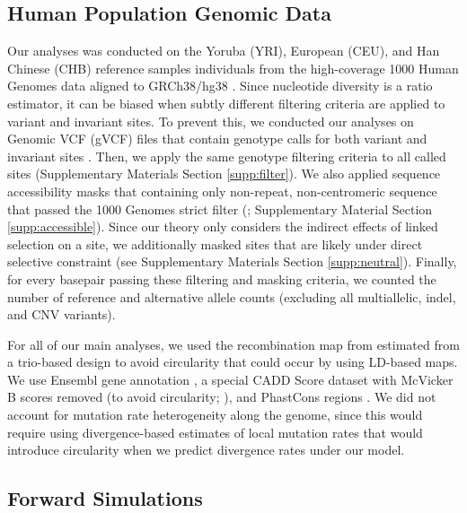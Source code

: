 \documentclass[11pt]{article}
\begin{document}
\subsection*{Human Population Genomic Data}
\label{sec:methods-data}

Our analyses was conducted on the Yoruba (YRI), European (CEU), and Han Chinese
(CHB) reference samples individuals from the high-coverage 1000 Human Genomes
data aligned to GRCh38/hg38 \parencite{Byrska-Bishop2022-tn}. Since nucleotide
diversity is a ratio estimator, it can be biased when subtly different
filtering criteria are applied to variant and invariant sites. To prevent this,
we conducted our analyses on Genomic VCF (gVCF) files that contain genotype
calls for both variant and invariant sites \parencite{Illumina_Inc2020-dk}.
Then, we apply the same genotype filtering criteria to all called sites
(Supplementary Materials Section \ref{supp:filter}). We also applied sequence
accessibility masks that containing only non-repeat, non-centromeric sequence
that passed the 1000 Genomes strict filter
(\cite{1000_Genomes_Project_Consortium2015-mi}; Supplementary Material Section
\ref{supp:accessible}). Since our theory only considers the indirect effects of
linked selection on a site, we additionally masked sites that are likely under
direct selective constraint (see Supplementary Materials Section
\ref{supp:neutral}). Finally, for every basepair passing these filtering and
masking criteria, we counted the number of reference and alternative allele
counts (excluding all multiallelic, indel, and CNV variants).

For all of our main analyses, we used the recombination map from
\textcite{Halldorsson2019-ey} estimated from a trio-based design to avoid
circularity that could occur by using LD-based maps. We use Ensembl gene
annotation \parencite{Cunningham2022-vk}, a special CADD Score dataset with
McVicker B scores removed (to avoid circularity;
\cite{Kircher2014-bv,Rentzsch2019-lr}), and PhastCons regions
\parencite{Siepel2005-wh}. We did not account for mutation rate heterogeneity
along the genome, since this would require using divergence-based estimates of
local mutation rates that would introduce circularity when we predict
divergence rates under our model.

\subsection*{Forward Simulations}
\label{sec:methods-sim}
\end{document}
